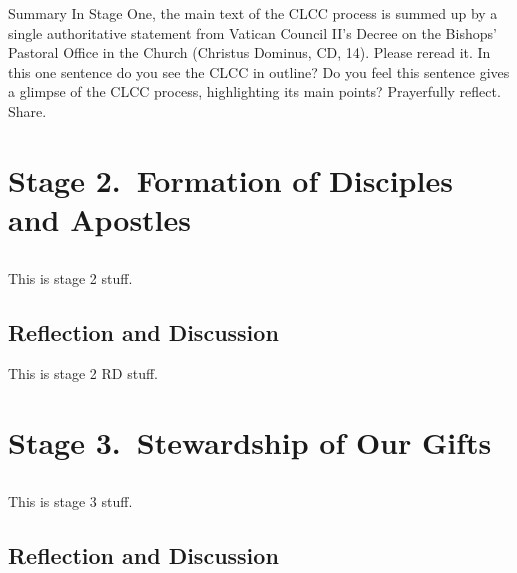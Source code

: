 \documentclass[oneside]{book}
\begin{document}
Summary
In Stage One, the main text of the CLCC process is summed up by a single
authoritative statement from Vatican Council II's Decree on the Bishops'
Pastoral Office in the Church (Christus Dominus, CD, 14). Please reread it. In
this one sentence do you see the CLCC in outline? Do you feel this sentence
gives a glimpse of the CLCC process, highlighting its main points? Prayerfully
reflect. Share.


\chapter{Stage 2.\ Formation of Disciples and Apostles}

\section*{} 

This is stage 2 stuff.


\section{Reflection and Discussion}

This is stage 2 RD stuff.


\chapter{Stage 3.\ Stewardship of Our Gifts}

\section*{} 

This is stage 3 stuff.


\section{Reflection and Discussion}
\end{document}
